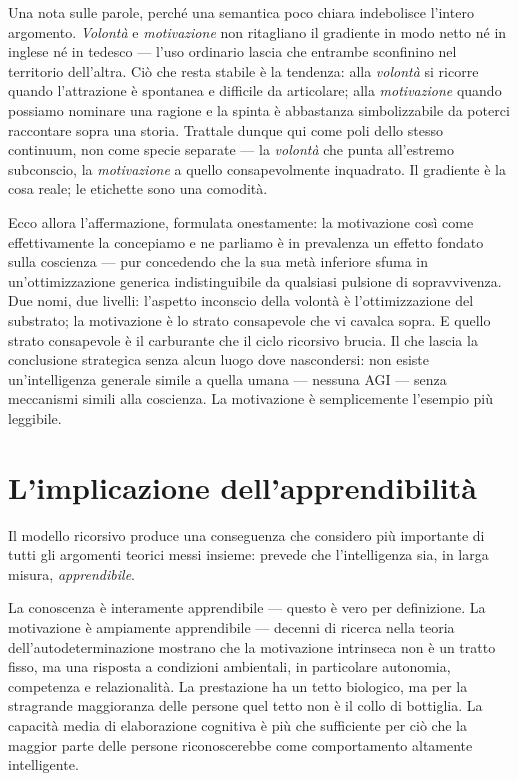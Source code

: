 \documentclass[11pt, twoside, openright]{book}
\begin{document}
Una nota sulle parole, perché una semantica poco chiara indebolisce l'intero argomento. \textit{Volontà} e \textit{motivazione} non ritagliano il gradiente in modo netto né in inglese né in tedesco --- l'uso ordinario lascia che entrambe sconfinino nel territorio dell'altra. Ciò che resta stabile è la tendenza: alla \textit{volontà} si ricorre quando l'attrazione è spontanea e difficile da articolare; alla \textit{motivazione} quando possiamo nominare una ragione e la spinta è abbastanza simbolizzabile da poterci raccontare sopra una storia. Trattale dunque qui come poli dello stesso continuum, non come specie separate --- la \textit{volontà} che punta all'estremo subconscio, la \textit{motivazione} a quello consapevolmente inquadrato. Il gradiente è la cosa reale; le etichette sono una comodità.

Ecco allora l'affermazione, formulata onestamente: la motivazione così come effettivamente la concepiamo e ne parliamo è in prevalenza un effetto fondato sulla coscienza --- pur concedendo che la sua metà inferiore sfuma in un'ottimizzazione generica indistinguibile da qualsiasi pulsione di sopravvivenza. Due nomi, due livelli: l'aspetto inconscio della volontà è l'ottimizzazione del substrato; la motivazione è lo strato consapevole che vi cavalca sopra. E quello strato consapevole è il carburante che il ciclo ricorsivo brucia. Il che lascia la conclusione strategica senza alcun luogo dove nascondersi: non esiste un'intelligenza generale simile a quella umana --- nessuna AGI --- senza meccanismi simili alla coscienza. La motivazione è semplicemente l'esempio più leggibile.

\section*{L'implicazione dell'apprendibilità}

Il modello ricorsivo produce una conseguenza che considero più importante di tutti gli argomenti teorici messi insieme: prevede che l'intelligenza sia, in larga misura, \textit{apprendibile}.

La conoscenza è interamente apprendibile --- questo è vero per definizione. La motivazione è ampiamente apprendibile --- decenni di ricerca nella teoria dell'autodeterminazione mostrano che la motivazione intrinseca non è un tratto fisso, ma una risposta a condizioni ambientali, in particolare autonomia, competenza e relazionalità. La prestazione ha un tetto biologico, ma per la stragrande maggioranza delle persone quel tetto non è il collo di bottiglia. La capacità media di elaborazione cognitiva è più che sufficiente per ciò che la maggior parte delle persone riconoscerebbe come comportamento altamente intelligente.
\end{document}
